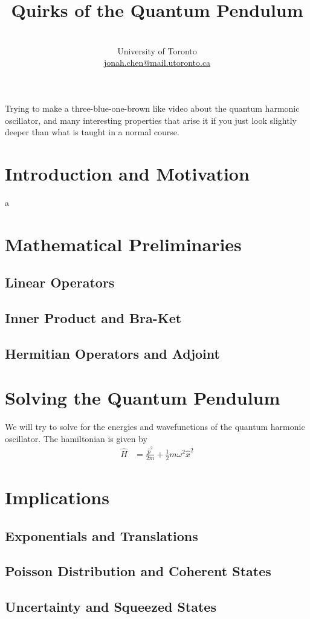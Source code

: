 \documentclass[a4paper]{article}
\title{\vspace{-50pt}\bfseries{\Large{Quirks of the Quantum Pendulum}}\vspace{-5pt}}
\author{\normalfont{Jonah Chen}\\\vspace{-3pt}\small{University of Toronto}\\
\vspace{-10pt}\small{\url{jonah.chen@mail.utoronto.ca}}}
\date{}
\numberwithin{equation}{section}
\begin{document}
\maketitle
\sffamily

Trying to make a three-blue-one-brown like video about the quantum harmonic oscillator, and many interesting properties that arise it if you just look slightly deeper than what is taught in a normal course.

\section{Introduction and Motivation}

\begin{script}
    a
\end{script}

\section{Mathematical Preliminaries}

\subsection{Linear Operators}

\subsection{Inner Product and Bra-Ket}

\subsection{Hermitian Operators and Adjoint}

\section{Solving the Quantum Pendulum}

We will try to solve for the energies and wavefunctions of the quantum harmonic oscillator. The hamiltonian is given by
\begin{align}
    \hat H&=\frac{\hat p^2}{2m}+\frac{1}{2}m\omega^2\hat x^2\label{qho_hamiltonian}
\end{align}





\section{Implications}

\subsection{Exponentials and Translations}

\subsection{Poisson Distribution and Coherent States}

\subsection{Uncertainty and Squeezed States}

\begin{thebibliography}{99}

\end{thebibliography}
\end{document}
